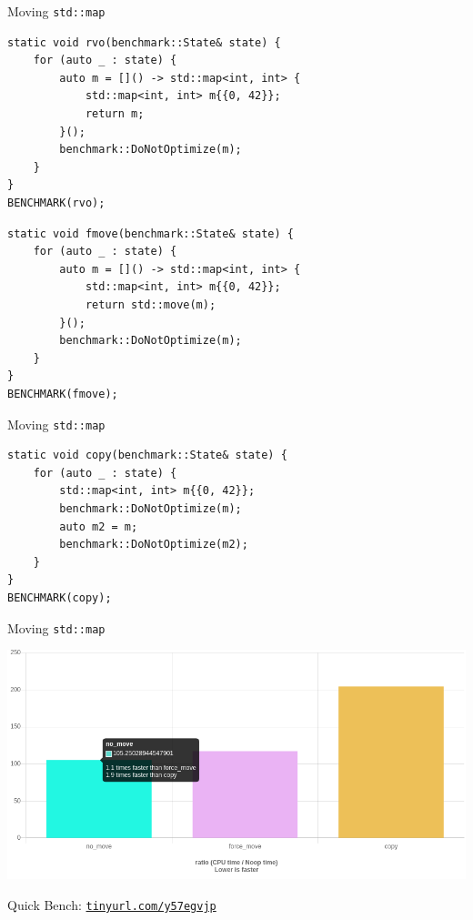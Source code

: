 \documentclass[compress,aspectratio=1610]{beamer}
\begin{document}
\begin{frame}[fragile]{Moving \texttt{std::map}}
    \begin{lstlisting}
static void rvo(benchmark::State& state) {
    for (auto _ : state) {
        auto m = []() -> std::map<int, int> {
            std::map<int, int> m{{0, 42}};
            return m;
        }();
        benchmark::DoNotOptimize(m);
    }
}
BENCHMARK(rvo);
    \end{lstlisting}

    \begin{lstlisting}
static void fmove(benchmark::State& state) {
    for (auto _ : state) {
        auto m = []() -> std::map<int, int> {
            std::map<int, int> m{{0, 42}};
            return std::move(m);
        }();
        benchmark::DoNotOptimize(m);
    }
}
BENCHMARK(fmove);
    \end{lstlisting}
\end{frame}
\begin{frame}[fragile]{Moving \texttt{std::map}}
    \begin{lstlisting}
static void copy(benchmark::State& state) {
    for (auto _ : state) {
        std::map<int, int> m{{0, 42}};
        benchmark::DoNotOptimize(m);
        auto m2 = m;
        benchmark::DoNotOptimize(m2);
    }
}
BENCHMARK(copy);
    \end{lstlisting}
\end{frame}

\begin{frame}{Moving \texttt{std::map}}
    \centering

    \includegraphics[width=.9\textwidth]{benchmark_map_mv.png}

    Quick Bench: \href{http://quick-bench.com/7L-__vxvraDDacztJoalrjBrMUA}{\texttt{tinyurl.com/y57egvjp}}
\end{frame}

\begin{frame}
    \centering

\end{frame}
\end{document}
